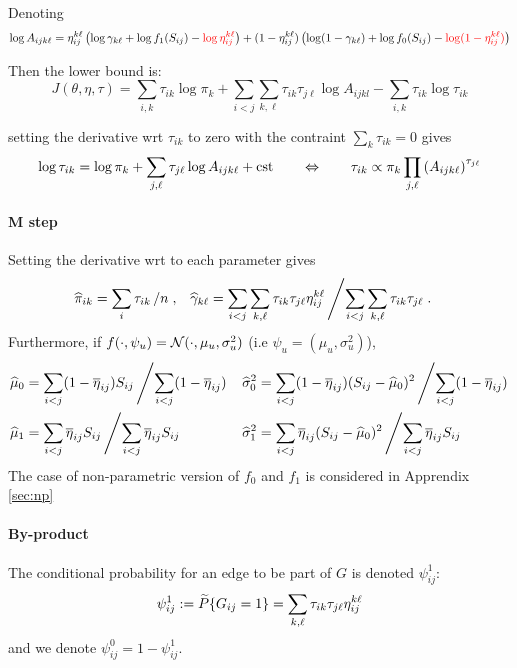  






\color{black}


Denoting 
$$
\log A_{ijk\ell} = \eta^{k\ell}_{ij} \left(\log \gamma_{k\ell} + \log f_1(S_{ij}) -  \color{red}\log \eta^{k\ell}_{ij} \color{black}\right) + (1 - \eta^{k\ell}_{ij}) \left(\log (1 - \gamma_{k\ell}) + \log f_0(S_{ij})  -  \color{red}\log (1- \eta^{k\ell}_{ij}) \color{black}\right)  
$$

Then the lower bound is: 
$$J(\theta,\eta,\tau) =   \sum_{i, k} \tau_{ik} \log \pi_k  + 
\sum_{i < j} \sum_{k, \ell} \tau_{ik} \tau_{j\ell} \log A_{ijkl} - \sum_{i, k} \tau_{ik} \log \tau_{ik}$$


setting the derivative wrt $\tau_{ik}$ to zero with the contraint $\sum_{k} \tau_{ik} = 0$ gives
$$
\log \tau_{ik} = \log \pi_k + \sum_{j, \ell} \tau_{j\ell} \log A_{ijk\ell} + \text{cst}
\qquad \Leftrightarrow \qquad
\tau_{ik} \propto \pi_k \prod_{j, \ell} \left(A_{ijk\ell}\right)^{\tau_{j\ell}}
$$

\paragraph{M step}
Setting the derivative wrt to each parameter gives
\begin{align*}
 \widehat{\pi}_{ik} & = \sum_{i} \tau_{ik} \left/ n \right.,  
 & \widehat{\gamma}_{k\ell} & = \sum_{i < j} \sum_{k, \ell} \tau_{ik} \tau_{j\ell} \eta^{k\ell}_{ij} \left/ \sum_{i < j} \sum_{k, \ell} \tau_{ik} \tau_{j\ell} \right..
\end{align*}
Furthermore, if $f(\cdot, \psi_u) = \mathcal{N}(\cdot, \mu_u, \sigma_u^2)$ (i.e $\psi_u = (\mu_u, \sigma_u^2)$), 
\begin{align*}
 \widehat{\mu}_0 & = \sum_{i < j} (1 - \overline{\eta}_{ij}) S_{ij} \left/ \sum_{i < j} (1 - \overline{\eta}_{ij}) \right. 
 & \widehat{\sigma}_0^2 & = \sum_{i < j} (1 - \overline{\eta}_{ij}) (S_{ij} - \widehat{\mu}_0)^2 \left/ \sum_{i < j} (1 - \overline{\eta}_{ij}) \right. \\ 
 \widehat{\mu}_1 & = \sum_{i < j} \overline{\eta}_{ij} S_{ij} \left/ \sum_{i < j} \overline{\eta}_{ij} S_{ij} \right. 
 & \widehat{\sigma}_1^2 & = \sum_{i < j} \overline{\eta}_{ij} (S_{ij} - \widehat{\mu}_0)^2 \left/ \sum_{i < j} \overline{\eta}_{ij} S_{ij} \right. \\ 
\end{align*}
The case of non-parametric version of $f_0$ and $f_1$ is considered in Apprendix \ref{sec:np}

\paragraph{By-product}
The conditional probability for an edge to be part of $G$ is denoted $\psi_{ij}^1$:
$$
\psi_{ij}^1 := \widetilde{P}\{G_{ij} = 1\} = \sum_{k, \ell} \tau_{ik} \tau_{j\ell} \eta^{k\ell}_{ij} 
$$
and we denote $\psi_{ij}^0 = 1 - \psi_{ij}^1$.

